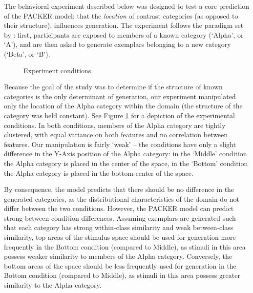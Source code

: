 \documentclass[10pt,letterpaper]{article}
\begin{document}
The behavioral experiment described below was designed to test a core prediction of the PACKER model: that the \textit{location} of contrast categories (as opposed to their structure), influences generation. The experiment follows the paradigm set by \citet{jern2013probabilistic}: first, participants are exposed to members of a known category (`Alpha', or `A'), and are then asked to generate exemplars belonging to a new category (`Beta', or `B').

\begin{figure}
    \begin{center}
    
    \caption{Experiment conditions.}
    \label{fig:middle-bottom-conditions}
    \end{center}
\end{figure}


Because the goal of the study was to determine if the structure of known categories is the only determinant of generation, our experiment manipulated only the location of the Alpha category within the domain (the structure of the category was held constant). See Figure \ref{fig:middle-bottom-conditions} for a depiction of the experimental conditions. In both conditions, members of the Alpha category are tightly clustered, with equal variance on both features and no correlation between features. Our manipulation is fairly `weak' --  the conditions have only a slight difference in the Y-Axis position of the Alpha category: in the `Middle' condition the Alpha category is placed in the center of the space, in the `Bottom' condition the Alpha category is placed in the bottom-center of the space. 

By consequence, the \citet{jern2013probabilistic} model predicts that there should be no difference in the generated categories, as the distributional characteristics of the domain do not differ between the two conditions. However, the PACKER model can predict strong between-condition differences. Assuming exemplars are generated such that each category has strong within-class similarity and weak between-class similarity, top areas of the stimulus space should be used for generation more frequently in the Bottom condition (compared to Middle), as  stimuli in this area possess weaker similarity to members of the Alpha category. Conversely, the bottom areas of the space should be less frequently used for generation in the Bottom condition (compared to Middle), as stimuli in this area possess greater similarity to the Alpha category.
\end{document}
